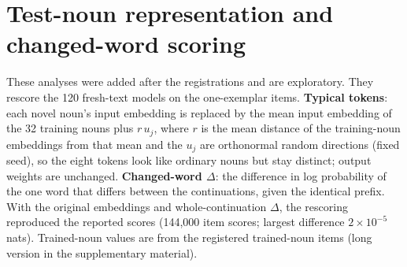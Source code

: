 \FloatBarrier
\section{Test-noun representation and changed-word scoring}\label{app:L}
\setcounter{table}{0}
\setcounter{figure}{0}
These analyses were added after the registrations and are exploratory. They rescore the 120 fresh-text models on the one-exemplar items. \textbf{Typical tokens}: each novel noun's input embedding is replaced by the mean input embedding of the 32 training nouns plus $r\,u_j$, where $r$ is the mean distance of the training-noun embeddings from that mean and the $u_j$ are orthonormal random directions (fixed seed), so the eight tokens look like ordinary nouns but stay distinct; output weights are unchanged. \textbf{Changed-word $\Delta$}: the difference in log probability of the one word that differs between the continuations, given the identical prefix. With the original embeddings and whole-continuation $\Delta$, the rescoring reproduced the reported scores (144,000 item scores; largest difference $2\times10^{-5}$ nats). Trained-noun values are from the registered trained-noun items (long version in the supplementary material).

